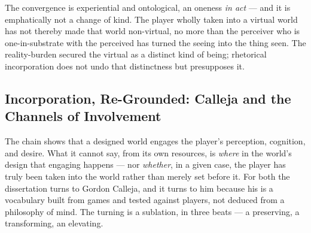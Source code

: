 \documentclass{article}
\begin{document}
The convergence is experiential and ontological, an oneness \textit{in act} — and it is emphatically not a change of kind. The player wholly taken into a virtual world has not thereby made that world non-virtual, no more than the perceiver who is one-in-substrate with the perceived has turned the seeing into the thing seen. The reality-burden secured the virtual as a distinct kind of being; rhetorical incorporation does not undo that distinctness but presupposes it.

\subsection*{Incorporation, Re-Grounded: Calleja and the Channels of Involvement}

The chain shows that a designed world engages the player's perception, cognition, and desire. What it cannot say, from its own resources, is \textit{where} in the world's design that engaging happens — nor \textit{whether}, in a given case, the player has truly been taken into the world rather than merely set before it. For both the dissertation turns to Gordon Calleja, and it turns to him because his is a vocabulary built from games and tested against players, not deduced from a philosophy of mind. The turning is a sublation, in three beats — a preserving, a transforming, an elevating.
\end{document}

